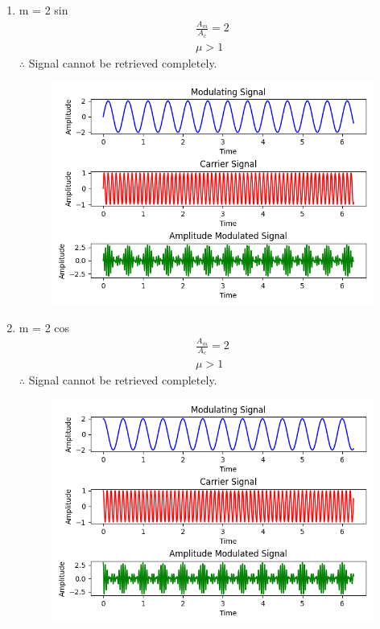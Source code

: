 \documentclass[journal,12pt,twocolumn]{IEEEtran}
\theoremstyle{remark}
\begin{document}
\begin{enumerate}
\begin{figure}[h]
\end{figure}
\item m = 2 sin 
\begin{align}
    \frac{A_m}{A_c}= 2\\
    \mu >1
\end{align}
$\therefore$ Signal cannot be retrieved completely.
\renewcommand{\thefigure}{\theenumi}
 \renewcommand{\thetable}{\theenumi}
\begin{figure}[h]
  
  \includegraphics[width=\columnwidth]{2022/IN/16/figs/Figure_3.png}
  
\end{figure}
\item m = 2 cos 
\begin{align}
    \frac{A_m}{A_c}= 2\\
    \mu > 1
\end{align}
$\therefore$ Signal cannot be retrieved completely.
\renewcommand{\thefigure}{\theenumi}
 \renewcommand{\thetable}{\theenumi}
\begin{figure}[h]
  
  \includegraphics[width=\columnwidth]{2022/IN/16/figs/Figure_4.png}
  
\end{figure}
\end{enumerate}
 
\end{document}
